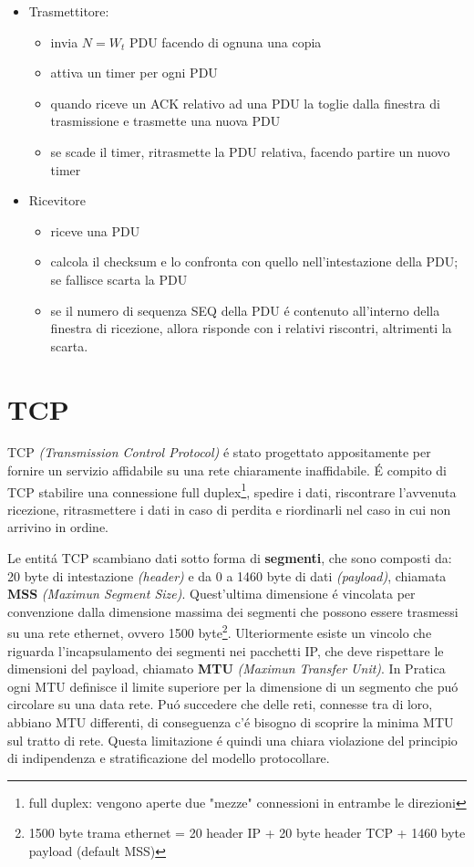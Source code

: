 \documentclass[12pt]{article}
\begin{document}
\begin{itemize}[noitemsep]
	\item Trasmettitore:
	\begin{itemize}[noitemsep]
		\item invia $N=W_t$ PDU facendo di ognuna una copia
		\item attiva un timer per ogni PDU
		\item quando riceve	un ACK relativo ad una PDU la toglie dalla finestra di trasmissione e trasmette una 
		      nuova PDU
		\item se scade il timer, ritrasmette la PDU relativa, facendo partire un nuovo timer
	\end{itemize}
	\item Ricevitore
    \begin{itemize}[noitemsep]
        \item riceve una PDU
   		\item calcola il checksum e lo confronta con quello nell'intestazione della PDU; se fallisce scarta la PDU
   		\item se il numero di sequenza SEQ della PDU \'e contenuto all'interno della finestra di 
   		      ricezione, allora risponde con i relativi riscontri, altrimenti la scarta.
	\end{itemize}
\end{itemize}



\section{TCP}\label{tcp}
TCP \textit{(Transmission Control Protocol)} \'e stato progettato appositamente per fornire un servizio affidabile 
su una rete chiaramente inaffidabile. \'E compito di TCP stabilire una connessione full duplex\footnote{full duplex: 
vengono aperte due "mezze" connessioni in entrambe le direzioni}, spedire i dati, riscontrare l'avvenuta ricezione, 
ritrasmettere i dati in caso di perdita e riordinarli nel caso in cui non arrivino in ordine.

Le entit\'a TCP scambiano dati sotto forma di \textbf{segmenti}, che sono composti da: 20 byte di intestazione
\textit{(header)} e da 0 a 1460 byte di dati \textit{(payload)}, chiamata 
\textbf{MSS} \textit{(Maximun Segment Size)}. Quest'ultima dimensione \'e vincolata per 
convenzione dalla dimensione massima dei segmenti che possono essere trasmessi su una rete ethernet, ovvero 1500 
byte\footnote{1500 byte trama ethernet = 20 header IP + 20 byte header TCP + 1460 byte payload (default MSS)}. 
Ulteriormente esiste un vincolo che riguarda l'incapsulamento  dei segmenti nei 
pacchetti IP, che deve rispettare le dimensioni del payload, chiamato \textbf{MTU} \textit{(Maximun 
Transfer Unit)}. In Pratica ogni MTU definisce il limite superiore per la dimensione di un segmento 
che pu\'o circolare su una data rete. Pu\'o succedere che delle reti, connesse tra di loro, abbiano MTU differenti, 
di conseguenza c'\'e bisogno di scoprire la minima MTU sul tratto di rete. Questa limitazione \'e quindi una chiara 
violazione del principio di indipendenza e stratificazione del modello protocollare.
\end{document}
